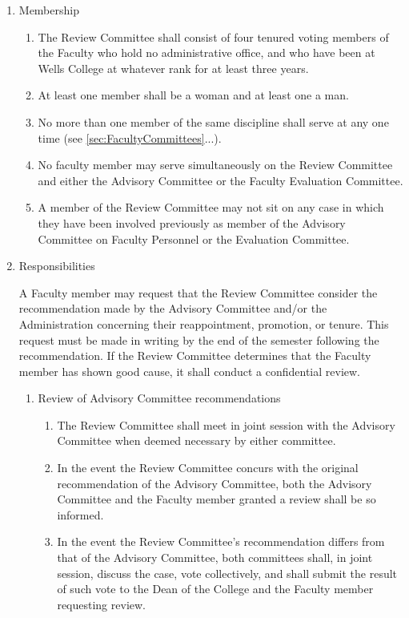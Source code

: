 \documentclass{manual}
\newcommand{\itemLevelA}{\alph*.}
\newcommand{\itemLevelB}{\arabic*)}
\newcommand{\itemLevelC}{\alph*)}
\newcommand{\itemRefA}{\alph*}
\newcommand{\itemRefB}{\arabic*}
\newcommand{\itemRefC}{\alph*}
\begin{document}
\begin{enumerate}[label=\itemLevelA,ref=\itemRefA]
\item Membership
\begin{enumerate}[label=\itemLevelB,ref=\itemRefB]
\item The Review Committee shall consist of four tenured voting members of the Faculty who hold no administrative office, and who have been at Wells College at whatever rank for at least three years.
\item At least one member shall be a woman and at least one a man.
\item No more than one member of the same discipline shall serve at any one time (see \cref{sec:FacultyCommittees}...).
\item No faculty member may serve simultaneously on the Review Committee and either the Advisory Committee or the Faculty Evaluation Committee.
\item A member of the Review Committee may not sit on any case in which they have been involved previously as member of the Advisory Committee on Faculty Personnel or the Evaluation Committee.

\end{enumerate}
\item Responsibilities

A Faculty member may request that the Review Committee consider the recommendation made by the Advisory Committee and/or the Administration concerning their reappointment, promotion, or tenure. This request must be made in writing by the end of the semester following the recommendation. If the Review Committee determines that the Faculty member has shown good cause, it shall conduct a confidential review.
\begin{enumerate}[label=\itemLevelB,ref=\itemRefB]
\item Review of Advisory Committee recommendations

\begin{enumerate}[label=\itemLevelC,ref=\itemRefC]
\item The Review Committee shall meet in joint session with the Advisory Committee when deemed necessary by either committee.
\item In the event the Review Committee concurs with the original recommendation of the Advisory Committee, both the Advisory Committee and the Faculty member granted a review shall be so informed.
\item In the event the Review Committee's recommendation differs from that of the Advisory Committee, both committees shall, in joint session, discuss the case, vote collectively, and shall submit the result of such vote to the Dean of the College and the Faculty member requesting review.


\end{enumerate}
\end{enumerate}
\end{enumerate}
\end{document}
